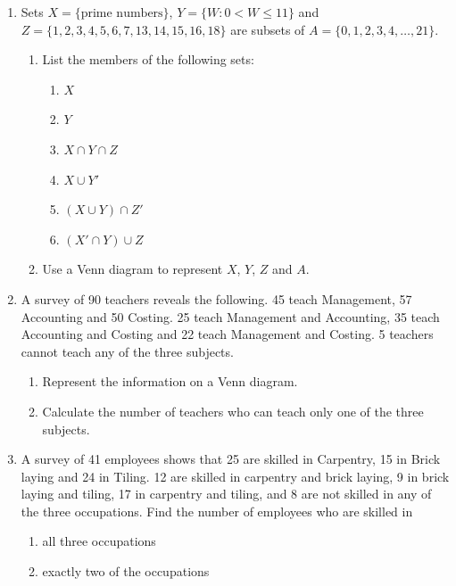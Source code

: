 \begin{enumerate}[resume]
\item Sets $X = \{\text{prime numbers}\}$, $Y = \{W : 0 < W \le 11\}$ and
$Z = \{1,2,3,4,5,6,7,13,14,15,16,18\}$ are subsets of $A = \{0,1,2,3,4,\ldots,21\}$.
\begin{enumerate}
  \item[a.] List the members of the following sets:
  \begin{enumerate}
    \item[i.] $X$
    \item[ii.] $Y$
    \item[iii.] $X\cap Y\cap Z$
    \item[iv.] $X\cup Y'$
    \item[v.] $(X\cup Y)\cap Z'$
    \item[vi.] $(X'\cap Y)\cup Z$
  \end{enumerate}
  \item[b.] Use a Venn diagram to represent $X$, $Y$, $Z$ and $A$.
\end{enumerate}

\item A survey of 90 teachers reveals the following. 45 teach Management, 57
Accounting and 50 Costing. 25 teach Management and Accounting, 35 teach
Accounting and Costing and 22 teach Management and Costing. 5 teachers
cannot teach any of the three subjects.
\begin{enumerate}
  \item[a.] Represent the information on a Venn diagram.
  \item[b.] Calculate the number of teachers who can teach only one of the three subjects.
\end{enumerate}

\item A survey of 41 employees shows that 25 are skilled in Carpentry, 15 in
Brick laying and 24 in Tiling. 12 are skilled in carpentry and brick laying,
9 in brick laying and tiling, 17 in carpentry and tiling, and 8 are not
skilled in any of the three occupations. Find the number of employees who
are skilled in
\begin{enumerate}
  \item[a.] all three occupations
  \item[b.] exactly two of the occupations
\end{enumerate}


\end{enumerate}
